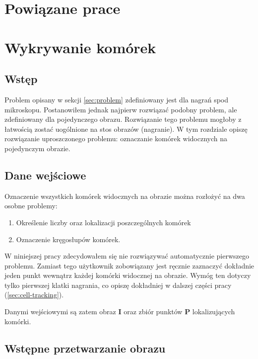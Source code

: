 \documentclass[declaration,shortabstract]{iithesis}
\newcommand{\image}{\mathbf{I}}
\begin{document}
\section{Powiązane prace}


\section{Wykrywanie komórek}

\subsection{Wstęp}

Problem opisany w sekcji \ref{sec:problem} zdefiniowany jest dla nagrań spod mikroskopu. Postanowiłem jednak najpierw rozwiązać podobny problem, ale zdefiniowany dla pojedynczego obrazu. Rozwiązanie tego problemu mogłoby z łatwością zostać uogólnione na stos obrazów (nagranie). W tym rozdziale opiszę rozwiązanie uproszczonego problemu: oznaczanie komórek widocznych na pojedynczym obrazie.


\subsection{Dane wejściowe}

Oznaczenie wszystkich komórek widocznych na obrazie można rozłożyć na dwa osobne problemy:
\begin{enumerate}
  \item Określenie liczby oraz lokalizacji poszczególnych komórek
  \item Oznaczenie kręgosłupów komórek.
\end{enumerate}

W niniejszej pracy zdecydowałem się nie rozwiązywać automatycznie pierwszego problemu. Zamiast tego użytkownik zobowiązany jest ręcznie zaznaczyć dokładnie jeden punkt wewnątrz każdej komórki widocznej na obrazie. Wymóg ten dotyczy tylko pierwszej klatki nagrania, co opiszę dokładniej w dalszej części pracy (\ref{sec:cell-tracking}).

Danymi wejściowymi są zatem obraz $\image$ oraz zbiór punktów $\mathbf{P}$ lokalizujących komórki.



\subsection{Wstępne przetwarzanie obrazu}
\end{document}

